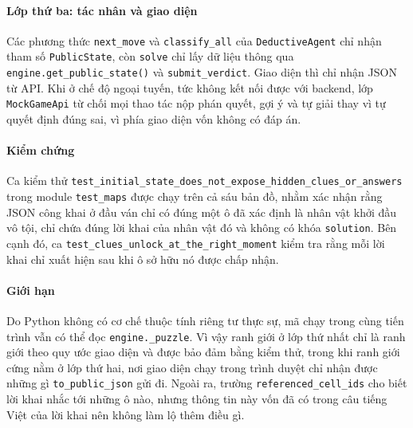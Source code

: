 \begin{sloppypar}
\paragraph{Lớp thứ ba: tác nhân và giao diện}
Các phương thức \texttt{next\_move} và \texttt{classify\_all} của
\texttt{DeductiveAgent} chỉ nhận tham số \texttt{PublicState}, còn \texttt{solve}
chỉ lấy dữ liệu thông qua \texttt{engine.get\_public\_state()} và
\texttt{submit\_verdict}. Giao diện thì chỉ nhận JSON từ API. Khi ở chế độ ngoại
tuyến, tức không kết nối được với backend, lớp \texttt{MockGameApi} từ chối mọi
thao tác nộp phán quyết, gợi ý và tự giải thay vì tự quyết định đúng sai, vì
phía giao diện vốn không có đáp án.

\paragraph{Kiểm chứng}
Ca kiểm thử \texttt{test\_initial\_state\_does\_not\_\allowbreak expose\_hidden\_\allowbreak clues\_or\_answers}
trong module \texttt{test\_maps} được chạy trên cả sáu bản đồ, nhằm xác nhận rằng
JSON công khai ở đầu ván chỉ có đúng một ô đã xác định là nhân vật khởi đầu vô
tội, chỉ chứa đúng lời khai của nhân vật đó và không có khóa \texttt{solution}.
Bên cạnh đó, ca \texttt{test\_clues\_unlock\_at\_the\_right\_moment} kiểm tra
rằng mỗi lời khai chỉ xuất hiện sau khi ô sở hữu nó được chấp nhận.

\paragraph{Giới hạn}
Do Python không có cơ chế thuộc tính riêng tư thực sự, mã chạy trong cùng tiến
trình vẫn có thể đọc \texttt{engine.\_puzzle}. Vì vậy ranh giới ở lớp thứ nhất
chỉ là ranh giới theo quy ước giao diện và được bảo đảm bằng kiểm thử, trong khi
ranh giới cứng nằm ở lớp thứ hai, nơi giao diện chạy trong trình duyệt chỉ nhận
được những gì \texttt{to\_public\_json} gửi đi. Ngoài ra, trường
\texttt{referenced\_cell\_ids} cho biết lời khai nhắc tới những ô nào, nhưng
thông tin này vốn đã có trong câu tiếng Việt của lời khai nên không làm lộ thêm
điều gì.
\end{sloppypar}
